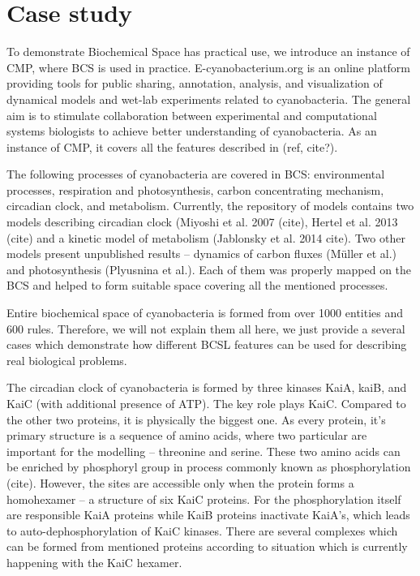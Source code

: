 \documentclass[12pt]{fithesis2}
\begin{document}
\chapter{Case study}

To demonstrate Biochemical Space has practical use, we introduce an instance of CMP, where BCS is used in practice. E-cyanobacterium.org is an online platform providing tools for public sharing, annotation, analysis, and visualization of dynamical models and wet-lab experiments related to cyanobacteria. The general aim is to stimulate collaboration between experimental and computational systems biologists to achieve better understanding of cyanobacteria. As an instance of CMP, it covers all the features described in (ref, cite?).

The following processes of cyanobacteria are covered in BCS: environmental processes, respiration and photosynthesis, carbon concentrating mechanism, circadian clock, and metabolism. Currently, the repository of models contains two models describing circadian clock (Miyoshi et al. 2007 (cite), Hertel et al. 2013 (cite) and a kinetic model of metabolism (Jablonsky et al. 2014 cite). Two other models present unpublished results -- dynamics of carbon fluxes (M\"{u}ller et al.) and photosynthesis (Plyusnina et al.). Each of them was properly mapped on the BCS and helped to form suitable space covering all the mentioned processes.

Entire biochemical space of cyanobacteria is formed from over 1000 entities and 600 rules. Therefore, we will not explain them all here, we just provide a several cases which demonstrate how different BCSL features can be used for describing real biological problems.

The circadian clock of cyanobacteria is formed by three kinases KaiA, kaiB, and KaiC (with additional presence of ATP). The key role plays KaiC. Compared to the other two proteins, it is physically the biggest one. As every protein, it's primary structure is a sequence of amino acids, where two particular are important for the modelling -- threonine and serine. These two amino acids can be enriched by phosphoryl group in process commonly known as phosphorylation (cite). However, the sites are accessible only when the protein forms a homohexamer -- a structure of six KaiC proteins. For the phosphorylation itself are responsible KaiA proteins while KaiB proteins inactivate KaiA's, which leads to auto-dephosphorylation of KaiC kinases. There are several complexes which can be formed from mentioned proteins according to situation which is currently happening with the KaiC hexamer.
\end{document}
